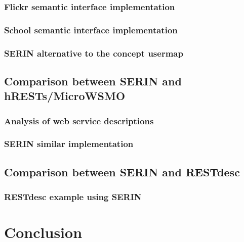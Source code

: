\documentclass{singlecol-new}
\theoremstyle{TH}{
\newtheorem{lemma}{Lemma}
\newtheorem{theorem}[lemma]{Theorem}
\newtheorem{corrolary}[lemma]{Corrolary}
\newtheorem{conjecture}[lemma]{Conjecture}
\newtheorem{proposition}[lemma]{Proposition}
\newtheorem{claim}[lemma]{Claim}
\newtheorem{stheorem}[lemma]{Wrong Theorem}
\newtheorem{algorithm}{Algorithm}
}
\theoremstyle{THrm}{
\newtheorem{definition}{Definition}[section]
\newtheorem{question}{Question}[section]
\newtheorem{remark}{Remark}
\newtheorem{scheme}{Scheme}
}
\theoremstyle{THhit}{
\newtheorem{case}{Case}[section]
}
\begin{document}
\subsubsection{Flickr semantic interface implementation}
\label{sec:flickr-implement}

\subsubsection{School semantic interface implementation}
\label{sec:school-implement}

\subsubsection{SERIN alternative to the concept usermap}
\label{sec:user-map}

\subsection{Comparison between SERIN and hRESTs/MicroWSMO}
\label{sec:hrests-implement}

\subsubsection{Analysis of web service descriptions}
\label{sec:}

\subsubsection{SERIN similar implementation}
\label{sec:hrestcomparison}

\subsection{Comparison between SERIN and RESTdesc}
\label{sec:restdesc-implement}

\subsubsection{RESTdesc example using SERIN}
\label{sec:restdesccomparison}

\section{Conclusion}
\label{sec:conclusion}




\end{document}
